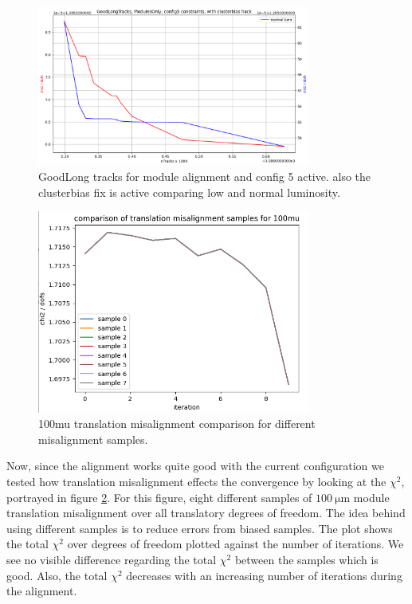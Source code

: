 \begin{figure}
  \centering
  \includegraphics[width=0.8\textwidth]{plots/feb_2_2022/GL_modules_c5_cb_hackactive_low_normal_lumi.png}
  \caption{GoodLong tracks for module alignment and config 5 active. also the clusterbias fix is active comparing low and normal luminosity.}
  \label{fig:GL_lumi_low_normal_hack_on}
\end{figure}

\begin{figure}
  \centering
  \includegraphics[width=0.8\textwidth]{plots/feb_6_2022/100mu_misalignment_samples_compared.png}
  \caption{100mu translation misalignment comparison for different misalignment samples.}
  \label{fig:100muT}
\end{figure}

Now, since the alignment works quite good with the current configuration we
tested how translation misalignment effects the convergence by looking at the
$\chi^2$, portrayed in figure \ref{fig:100muT}. For this figure, eight different samples of $\SI{100}{\micro\metre}$ module translation misalignment over all translatory
degrees of freedom. The idea behind using different samples is to reduce errors
from biased samples. The plot shows the total $\chi^2$ over degrees of freedom
plotted against the number of iterations. We see no visible difference regarding
the total $\chi^2$ between the samples which is good.
Also, the total $\chi^2$ decreases with an increasing number of iterations
during the alignment.

